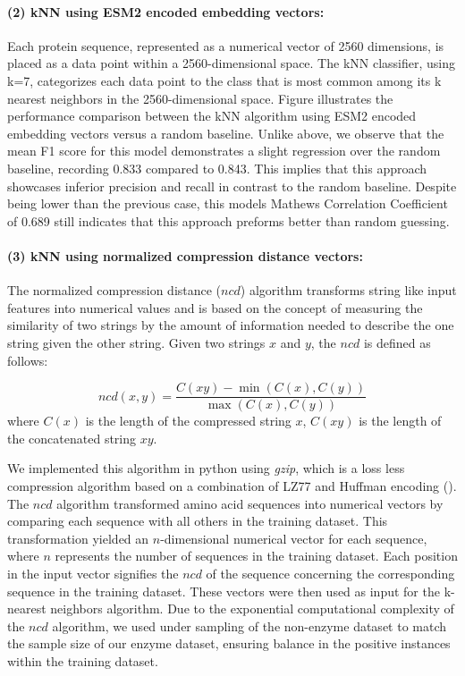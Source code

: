 \documentclass{bioinfo}
\begin{document}
\paragraph{(2) kNN using ESM2 encoded embedding vectors:}
Each protein sequence, represented as a numerical vector of 2560 dimensions, is placed as a data point within a 2560-dimensional space.
The kNN classifier, using k=7, categorizes each data point to the class that is most common among its k nearest neighbors in the 2560-dimensional space.
Figure 
illustrates the performance comparison between the kNN algorithm using ESM2 encoded embedding vectors versus a random baseline.
Unlike above, we observe that the mean F1 score for this model demonstrates a slight regression over the random baseline, recording 0.833
compared to 0.843. This implies that this approach showcases inferior precision and recall in contrast to the random baseline.
Despite being lower than the previous case, this models Mathews Correlation Coefficient of 0.689 still indicates that this approach preforms 
better than random guessing.

\paragraph{(3) kNN using normalized compression distance vectors:}
The normalized compression distance ($ncd$) algorithm transforms string like input features into numerical values and is based on the concept of measuring 
the similarity of two strings by the amount of information needed to describe the one string given the other string. 
Given two strings $x$ and $y$, the $ncd$ is defined as follows:

\begin{equation}
	ncd(x,y) = \frac{C(xy)-\min(C(x),C(y))}{\max(C(x),C(y))}
\end{equation}
where $C(x)$ is the length of the compressed string $x$, $C(xy)$ is the length of the concatenated string $xy$. 

We implemented this algorithm in python using \textit{gzip}, which is a loss less compression algorithm based on a combination of LZ77 and Huffman encoding (\cite{Rigler2007}).
The $ncd$ algorithm transformed amino acid sequences into numerical vectors by comparing each sequence with all others in the training dataset.
This transformation yielded an $n$-dimensional numerical vector for each sequence, where $n$ represents the number of sequences in the training dataset.
Each position in the input vector signifies the $ncd$ of the sequence concerning the corresponding sequence in the training dataset. 
These vectors were then used as input for the k-nearest neighbors algorithm.
Due to the exponential computational complexity of the $ncd$ algorithm, we used under sampling of the non-enzyme dataset to match the sample size of our enzyme dataset,
ensuring balance in the positive instances within the training dataset. 
\end{document}
